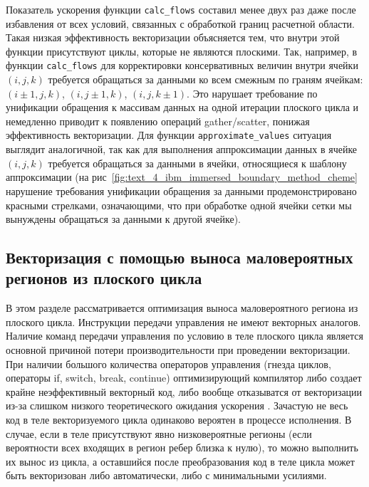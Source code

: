 Показатель ускорения функции \texttt{calc\_flows} составил менее двух раз даже после избавления от всех условий, связанных с обработкой границ расчетной области.
Такая низкая эффективность векторизации объясняется тем, что внутри этой функции присутствуют циклы, которые не являются плоскими.
Так, например, в функции \texttt{calc\_flows} для корректировки консервативных величин внутри ячейки $(i, j, k)$ требуется обращаться за данными ко всем смежным по граням ячейкам: $(i \pm 1, j, k)$, $(i, j \pm 1, k)$, $(i, j, k \pm 1)$.
Это нарушает требование по унификации обращения к массивам данных на одной итерации плоского цикла и немедленно приводит к появлению операций gather/scatter, понижая эффективность векторизации.
Для функции \texttt{approximate\_values} ситуация выглядит аналогичной, так как для выполнения аппроксимации данных в ячейке $(i, j, k)$ требуется обращаться за данными в ячейки, относящиеся к шаблону аппроксимации (на рис~\ref{fig:text_4_ibm_immersed_boundary_method_cheme} нарушение требования унификации обращения за данными продемонстрировано красными стрелками, означающими, что при обработке одной ячейки сетки мы вынуждены обращаться за данными к другой ячейке).


\subsection{Векторизация с помощью выноса маловероятных регионов из плоского цикла}\label{sec:text_4_loc_branch}

В этом разделе рассматривается оптимизация выноса маловероятного региона из плоского цикла.
Инструкции передачи управления не имеют векторных аналогов.
Наличие команд передачи управления по условию в теле плоского цикла является основной причиной потери производительности при проведении векторизации.
При наличии большого количества операторов управления (гнезда циклов, операторы if, switch, break, continue) оптимизирующий компилятор либо создает крайне неэффективный векторный код, либо вообще отказыватся от векторизации из-за слишком низкого теоретического ожидания ускорения \cite{Rybakov2018VecBranch}.
Зачастую не весь код в теле векторизуемого цикла одинаково вероятен в процессе исполнения.
В случае, если в теле присутствуют явно низковероятные регионы (если вероятности всех входящих в регион ребер близка к нулю), то можно выполнить их вынос из цикла, а оставшийся после преобразования код в теле цикла может быть векторизован либо автоматически, либо с минимальными усилиями.

